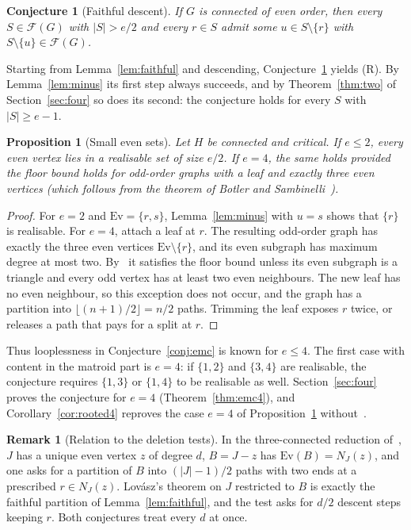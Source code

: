 \documentclass[11pt]{amsart}
\newtheorem{proposition}[theorem]{Proposition}
\newtheorem{conjecture}[theorem]{Conjecture}
\theoremstyle{definition}
\newtheorem{remark}[theorem]{Remark}
\newcommand{\cF}{\mathcal F}
\newcommand{\Ev}{\mathrm{Ev}}
\begin{document}
\begin{conjecture}[Faithful descent]\label{conj:fd}
If $G$ is connected of even order, then every $S\in\cF(G)$ with $|S|>e/2$ and every $r\in S$ admit
some $u\in S\setminus\{r\}$ with $S\setminus\{u\}\in\cF(G)$.
\end{conjecture}

Starting from Lemma~\ref{lem:faithful} and descending, Conjecture~\ref{conj:fd} yields (R). By
Lemma~\ref{lem:minus} its first step always succeeds, and by Theorem~\ref{thm:two} of
Section~\ref{sec:four} so does its second: the conjecture holds for every $S$ with $|S|\ge e-1$.

\begin{proposition}[Small even sets]\label{prop:small}
Let $H$ be connected and critical. If $e\le 2$, every even vertex lies in a realisable set of size $e/2$.
If $e=4$, the same holds provided the floor bound holds for odd-order graphs with a leaf and exactly
three even vertices (which follows from the theorem of Botler and Sambinelli~\cite{BS}).
\end{proposition}

\begin{proof}
For $e=2$ and $\Ev=\{r,s\}$, Lemma~\ref{lem:minus} with $u=s$ shows that $\{r\}$ is realisable. For $e=4$,
attach a leaf at $r$. The resulting odd-order graph has exactly the three even vertices $\Ev\setminus\{r\}$,
and its even subgraph has maximum degree at most two. By~\cite[Theorem~13]{BS} it satisfies the floor
bound unless its even subgraph is a triangle and every odd vertex has at least two even neighbours.
The new leaf has no even neighbour, so this exception does not occur, and the graph has a partition
into $\lfloor (n+1)/2\rfloor=n/2$ paths. Trimming the leaf exposes $r$ twice, or releases a path that
pays for a split at $r$.
\end{proof}

Thus looplessness in Conjecture~\ref{conj:emc} is known for $e\le4$. The first case with content in the
matroid part is $e=4$: if $\{1,2\}$ and $\{3,4\}$ are realisable, the conjecture requires $\{1,3\}$ or
$\{1,4\}$ to be realisable as well. Section~\ref{sec:four} proves the conjecture for $e=4$
(Theorem~\ref{thm:emc4}), and Corollary~\ref{cor:rooted4} reproves the case $e=4$ of
Proposition~\ref{prop:small} without~\cite{BS}.

\begin{remark}[Relation to the deletion tests]
In the three-connected reduction of~\cite{MR}, $J$ has a unique even vertex $z$ of degree $d$,
$B=J-z$ has $\Ev(B)=N_J(z)$, and one asks for a partition of $B$ into $(|J|-1)/2$ paths with two ends
at a prescribed $r\in N_J(z)$. Lov\'asz's theorem on $J$ restricted to $B$ is exactly the faithful
partition of Lemma~\ref{lem:faithful}, and the test asks for $d/2$ descent steps keeping $r$. Both
conjectures treat every $d$ at once.
\end{remark}
\end{document}
